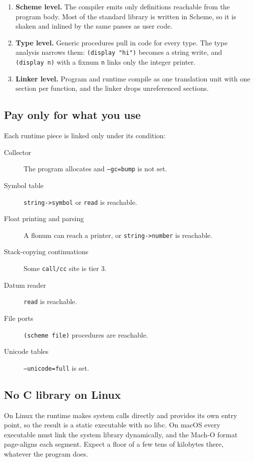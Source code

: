 \documentclass[a4paper,11pt]{article}
\begin{document}
\begin{enumerate}
\item \textbf{Scheme level.} The compiler emits only definitions reachable
  from the program body. Most of the standard library is written in Scheme,
  so it is shaken and inlined by the same passes as user code.
\item \textbf{Type level.} Generic procedures pull in code for every type.
  The type analysis narrows them: \texttt{(display "hi")} becomes a string
  write, and \texttt{(display n)} with a fixnum \texttt{n} links only the
  integer printer.
\item \textbf{Linker level.} Program and runtime compile as one translation
  unit with one section per function, and the linker drops unreferenced
  sections.
\end{enumerate}

\subsection{Pay only for what you use}

Each runtime piece is linked only under its condition:

\begin{description}
\item[Collector] The program allocates and \texttt{--gc=bump} is not set.
\item[Symbol table] \texttt{string->symbol} or \texttt{read} is reachable.
\item[Float printing and parsing] A flonum can reach a printer, or
  \texttt{string->number} is reachable.
\item[Stack-copying continuations] Some \texttt{call/cc} site is tier 3.
\item[Datum reader] \texttt{read} is reachable.
\item[File ports] \texttt{(scheme file)} procedures are reachable.
\item[Unicode tables] \texttt{--unicode=full} is set.
\end{description}

\subsection{No C library on Linux}

On Linux the runtime makes system calls directly and provides its own entry
point, so the result is a static executable with no libc. On macOS every
executable must link the system library dynamically, and the Mach-O format
page-aligns each segment. Expect a floor of a few tens of kilobytes there,
whatever the program does.
\end{document}
